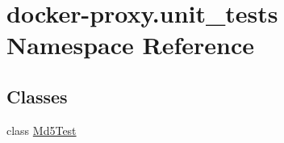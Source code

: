 \hypertarget{namespacedocker-proxy_1_1unit__tests}{}\section{docker-\/proxy.unit\+\_\+tests Namespace Reference}
\label{namespacedocker-proxy_1_1unit__tests}
\subsection*{Classes}
\begin{DoxyCompactItemize}
\item 
class \hyperlink{classdocker-proxy_1_1unit__tests_1_1_md5_test}{Md5\+Test}
\end{DoxyCompactItemize}
